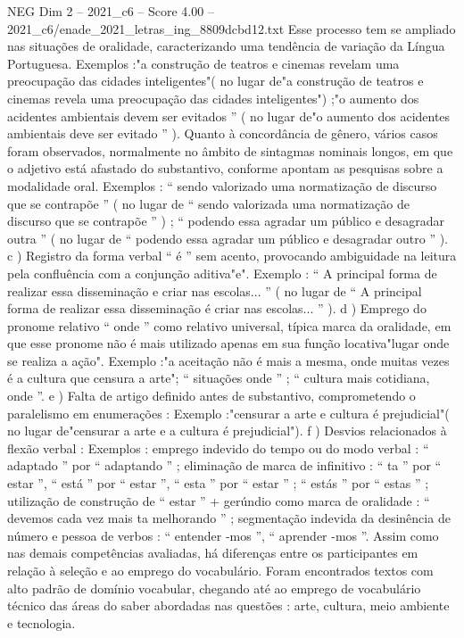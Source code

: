 \begin{textsample}{NEG Dim 2 – 2021\_c6 – Score 4.00 – 2021\_c6/enade\_2021\_letras\_ing\_8809dcbd12.txt}
Esse processo tem se ampliado nas situações de oralidade, caracterizando uma tendência de variação da Língua Portuguesa.
Exemplos :"a construção de teatros e cinemas revelam uma preocupação das cidades inteligentes"( no lugar de"a construção de teatros e cinemas revela uma preocupação das cidades inteligentes") ;"o aumento dos acidentes ambientais devem ser evitados ” ( no lugar de"o aumento dos acidentes ambientais deve ser evitado ” ).
Quanto à concordância de gênero, vários casos foram observados, normalmente no âmbito de sintagmas nominais longos, em que o adjetivo está afastado do substantivo, conforme apontam as pesquisas sobre a modalidade oral.
Exemplos : “ sendo valorizado uma normatização de discurso que se contrapõe ” ( no lugar de “ sendo valorizada uma normatização de discurso que se contrapõe ” ) ; “ podendo essa agradar um público e desagradar outra ” ( no lugar de “ podendo essa agradar um público e desagradar outro ” ). c ) Registro da forma verbal “ é ” sem acento, provocando ambiguidade na leitura pela confluência com a conjunção aditiva"e".
Exemplo : “ A principal forma de realizar essa disseminação e criar nas escolas... ” ( no lugar de “ A principal forma de realizar essa disseminação é criar nas escolas... ” ). d ) Emprego do pronome relativo “ onde ” como relativo universal, típica marca da oralidade, em que esse pronome não é mais utilizado apenas em sua função locativa"lugar onde se realiza a ação".
Exemplo :"a aceitação não é mais a mesma, onde muitas vezes é a cultura que censura a arte"; “ situações onde ” ; “ cultura mais cotidiana, onde ”. e ) Falta de artigo definido antes de substantivo, comprometendo o paralelismo em enumerações : Exemplo :"censurar a arte e cultura é prejudicial"( no lugar de"censurar a arte e a cultura é prejudicial"). f ) Desvios relacionados à flexão verbal : Exemplos : emprego indevido do tempo ou do modo verbal : “ adaptado ” por “ adaptando ” ; eliminação de marca de infinitivo : “ ta ” por “ estar ”, “ está ” por “ estar ”, “ esta ” por “ estar ” ; “ estás ” por “ estas ” ; utilização de construção de “ estar ” + gerúndio como marca de oralidade : “ devemos cada vez mais ta melhorando ” ; segmentação indevida da desinência de número e pessoa de verbos : “ entender -mos ”, “ aprender -mos ”.
Assim como nas demais competências avaliadas, há diferenças entre os participantes em relação à seleção e ao emprego do vocabulário.
Foram encontrados textos com alto padrão de domínio vocabular, chegando até ao emprego de vocabulário técnico das áreas do saber abordadas nas questões : arte, cultura, meio ambiente e tecnologia.

\end{textsample}
